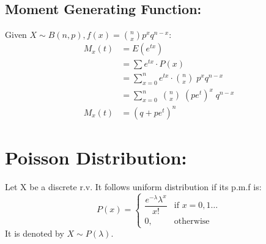 \documentclass[
10pt, %
a4paper, %
]{report}
\begin{document}
\subsection*{Moment Generating Function:}
Given \(X \sim B(n, p), f(x)=\binom{n}{x} p^x q^{n-x}:\)
\begin{align*}
    M_x(t) &= E(e^{tx}) \\
           &= \sum e^{tx} \cdot P(x) \\
           &= \sum_{x=0}^n e^{tx} \cdot \binom{n}{x} \; p^x q^{n-x} \\
           &= \sum_{x=0}^n \; \binom{n}{x} \; (pe^t)^x \; q^{n-x}\\
    M_x(t) &= (q+pe^t)^n
\end{align*}

\newpage

\section*{Poisson Distribution:}

Let X be a discrete r.v. It follows uniform distribution if its p.m.f is:
\[
    P(x)= 
\begin{cases}
    \dfrac{e^{-\lambda} \lambda^x}{x!}        & \text{if } x = 0,1\dots\\
    0,                              & \text{otherwise}
\end{cases}
\]
It is denoted by \(X \sim P(\lambda).\)
\end{document}
